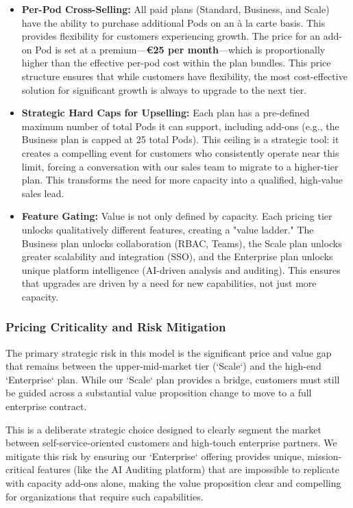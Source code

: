 \begin{itemize}
    \item \textbf{Per-Pod Cross-Selling:} All paid plans (Standard, Business, and Scale) have the ability to purchase additional Pods on an à la carte basis. This provides flexibility for customers experiencing growth. The price for an add-on Pod is set at a premium---\textbf{\euro{25} per month}---which is proportionally higher than the effective per-pod cost within the plan bundles. This price structure ensures that while customers have flexibility, the most cost-effective solution for significant growth is always to upgrade to the next tier.

    \item \textbf{Strategic Hard Caps for Upselling:} Each plan has a pre-defined maximum number of total Pods it can support, including add-ons (e.g., the Business plan is capped at 25 total Pods). This ceiling is a strategic tool: it creates a compelling event for customers who consistently operate near this limit, forcing a conversation with our sales team to migrate to a higher-tier plan. This transforms the need for more capacity into a qualified, high-value sales lead.

    \item \textbf{Feature Gating:} Value is not only defined by capacity. Each pricing tier unlocks qualitatively different features, creating a "value ladder." The Business plan unlocks collaboration (RBAC, Teams), the Scale plan unlocks greater scalability and integration (SSO), and the Enterprise plan unlocks unique platform intelligence (AI-driven analysis and auditing). This ensures that upgrades are driven by a need for new capabilities, not just more capacity.
\end{itemize}

\subsubsection{Pricing Criticality and Risk Mitigation}

The primary strategic risk in this model is the significant price and value gap that remains between the upper-mid-market tier (`Scale`) and the high-end `Enterprise` plan. While our `Scale` plan provides a bridge, customers must still be guided across a substantial value proposition change to move to a full enterprise contract.

This is a deliberate strategic choice designed to clearly segment the market between self-service-oriented customers and high-touch enterprise partners. We mitigate this risk by ensuring our `Enterprise` offering provides unique, mission-critical features (like the AI Auditing platform) that are impossible to replicate with capacity add-ons alone, making the value proposition clear and compelling for organizations that require such capabilities.

